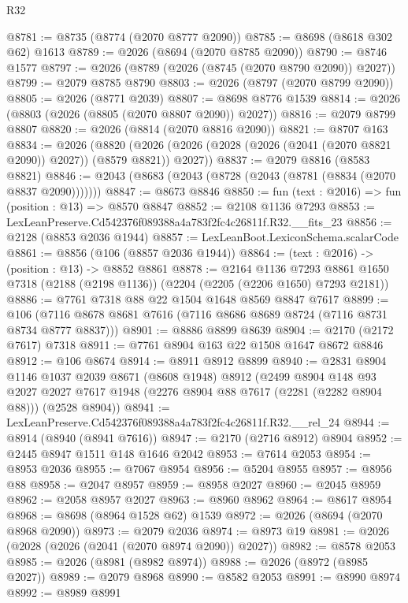 \begin{lexlean}{R32}
\begin{coremodule}
@8781 := @8735 (@8774 (@2070 @8777 @2090))
@8785 := @8698 (@8618 @302 @62) @1613
@8789 := @2026 (@8694 (@2070 @8785 @2090))
@8790 := @8746 @1577
@8797 := @2026 (@8789 (@2026 (@8745 (@2070 @8790 @2090)) @2027))
@8799 := @2079 @8785 @8790
@8803 := @2026 (@8797 (@2070 @8799 @2090))
@8805 := @2026 (@8771 @2039)
@8807 := @8698 @8776 @1539
@8814 := @2026 (@8803 (@2026 (@8805 (@2070 @8807 @2090)) @2027))
@8816 := @2079 @8799 @8807
@8820 := @2026 (@8814 (@2070 @8816 @2090))
@8821 := @8707 @163
@8834 := @2026
    (@8820 (@2026 (@2026 (@2028 (@2026 (@2041 (@2070 @8821 @2090)) @2027)) (@8579 @8821)) @2027))
@8837 := @2079 @8816 (@8583 @8821)
@8846 := @2043 (@8683 (@2043 (@8728 (@2043 (@8781 (@8834 (@2070 @8837 @2090)))))))
@8847 := @8673 @8846
@8850 := fun (text : @2016) => fun (position : @13) => @8570 @8847
@8852 := @2108 @1136 @7293
@8853 := LexLeanPreserve.Cd542376f089388a4a783f2fc4c26811f.R32.__fits_23
@8856 := @2128 (@8853 @2036 @1944)
@8857 := LexLeanBoot.LexiconSchema.scalarCode
@8861 := @8856 (@106 (@8857 @2036 @1944))
@8864 := (text : @2016) -> (position : @13) -> @8852 @8861
@8878 := @2164
    @1136
    @7293
    @8861
    @1650
    @7318
    (@2188 (@2198 @1136))
    (@2204 (@2205 (@2206 @1650) @7293 @2181))
@8886 := @7761 @7318 @88 @22 @1504 @1648 @8569 @8847 @7617
@8899 := @106 (@7116 @8678 @8681 @7616 (@7116 @8686 @8689 @8724 (@7116 @8731 @8734 @8777 @8837)))
@8901 := @8886 @8899 @8639
@8904 := @2170 (@2172 @7617) @7318
@8911 := @7761 @8904 @163 @22 @1508 @1647 @8672 @8846
@8912 := @106 @8674
@8914 := @8911 @8912 @8899
@8940 := @2831
    @8904
    @1146
    @1037
    @2039
    @8671
    (@8608 @1948)
    @8912
    (@2499
      @8904
      @148
      @93
      @2027
      @2027
      @7617
      @1948
      (@2276 @8904 @88 @7617 (@2281 (@2282 @8904 @88)))
      (@2528 @8904))
@8941 := LexLeanPreserve.Cd542376f089388a4a783f2fc4c26811f.R32.__rel_24
@8944 := @8914 (@8940 (@8941 @7616))
@8947 := @2170 (@2716 @8912) @8904
@8952 := @2445 @8947 @1511 @148 @1646 @2042
@8953 := @7614 @2053
@8954 := @8953 @2036
@8955 := @7067 @8954
@8956 := @5204 @8955
@8957 := @8956 @88
@8958 := @2047 @8957
@8959 := @8958 @2027
@8960 := @2045 @8959
@8962 := @2058 @8957 @2027
@8963 := @8960 @8962
@8964 := @8617 @8954
@8968 := @8698 (@8964 @1528 @62) @1539
@8972 := @2026 (@8694 (@2070 @8968 @2090))
@8973 := @2079 @2036
@8974 := @8973 @19
@8981 := @2026 (@2028 (@2026 (@2041 (@2070 @8974 @2090)) @2027))
@8982 := @8578 @2053
@8985 := @2026 (@8981 (@8982 @8974))
@8988 := @2026 (@8972 (@8985 @2027))
@8989 := @2079 @8968
@8990 := @8582 @2053
@8991 := @8990 @8974
@8992 := @8989 @8991

\end{coremodule}
\end{lexlean}
